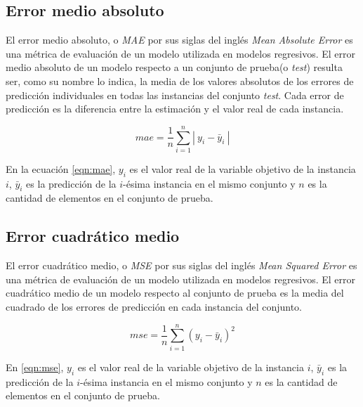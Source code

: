     
    \subsection{Error medio absoluto}
    El error medio absoluto, o \textit{MAE} por sus siglas del inglés \textit{Mean Absolute Error} es una métrica de evaluación de un modelo utilizada
    en modelos regresivos. El error medio absoluto de un modelo respecto a un conjunto de prueba(o \textit{test}) resulta ser, como su nombre lo indica, la media de los
    valores absolutos de los errores de predicción individuales en todas las instancias del conjunto \textit{test}. Cada error de predicción es la diferencia entre la estimación 
    y el valor real de cada instancia\cite{5}.
    
    \begin{equation}\label{eqn:mae}
        mae = \frac{1}{n} \sum_{i=1}^n|~y_i - \bar{y}_i~|
    \end{equation}

    En la ecuación \ref{eqn:mae}, $y_i$ es el valor real de la variable objetivo de la instancia $i$, $\bar{y}_i$ es la predicción de la $i$-ésima instancia en el mismo conjunto
    y $n$ es la cantidad de elementos en el conjunto de prueba.

    \subsection{Error cuadrático medio}
    El error cuadrático medio, o \textit{MSE} por sus siglas del inglés \textit{Mean Squared Error} es una métrica de evaluación de un modelo utilizada
    en modelos regresivos. El error cuadrático medio de un modelo respecto al conjunto de prueba es la media del cuadrado de los errores de predicción 
    en cada instancia del conjunto\cite{4}.

    \begin{equation}\label{eqn:mse}
        mse = \frac{1}{n} \sum_{i=1}^n(y_i - \bar{y}_i)^2
    \end{equation}

    En \ref{eqn:mse}, $y_i$ es el valor real de la variable objetivo de la instancia $i$, $\bar{y}_i$ es la predicción de la $i$-ésima instancia en el mismo conjunto
    y $n$ es la cantidad de elementos en el conjunto de prueba.
%   
%
%
%
